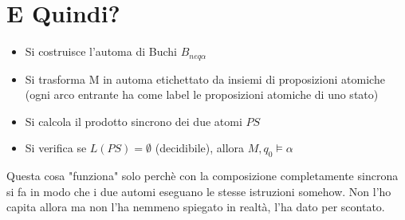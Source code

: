 \section{E Quindi?}

\begin{itemize}
  \item Si costruisce l'automa di Buchi $B_{neq \alpha}$
  \item Si trasforma M in automa etichettato da insiemi di proposizioni atomiche (ogni arco entrante ha come label le proposizioni atomiche di uno stato)
  \item Si calcola il prodotto sincrono dei due atomi $PS$
  \item Si verifica se $L(PS) = \emptyset$ (decidibile), allora $M,q_0 \models \alpha$
\end{itemize}

Questa cosa "funziona" solo perch\`e con la composizione completamente sincrona si fa in modo che i due automi eseguano le stesse istruzioni somehow. Non l'ho capita allora ma non l'ha nemmeno spiegato in realt\`a, l'ha dato per scontato.
